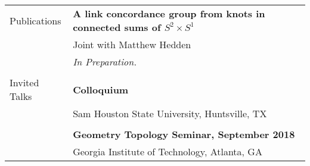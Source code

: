 \documentclass[letterpaper,11pt,oneside]{article}
\begin{document}
\begin{tabular}{@{} l l}
 \Large{Publications}    & \textbf{A link concordance group from knots in connected sums of $S^2 \times S^1$} \\
     & Joint with Matthew Hedden \\
     & \sl{In Preparation.}  \\
     & \\
     
       \Large{Invited Talks}   & \textbf{Colloquium } \\
     & Sam Houston State University, Huntsville, TX\\
     & \\
       & \textbf{Geometry Topology Seminar, September 2018} \\
     & Georgia Institute of Technology, Atlanta, GA\\
     
          \end{tabular}
\end{document}
